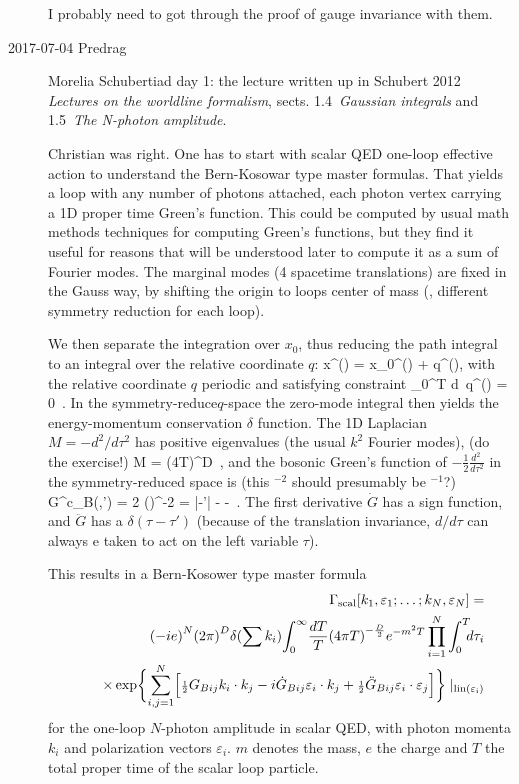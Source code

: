\begin{description}
I probably need to got through the proof of gauge invariance with them.

\item[2017-07-04 Predrag] Morelia Schubertiad day 1:
the lecture written up in Schubert 2012 {\em Lectures on
the worldline formalism}, sects. 1.4~{\em Gaussian integrals} and
1.5~{\em The N-photon amplitude}.

Christian was right. One has to start with scalar QED one-loop effective
action to understand the Bern-Kosowar type master formulas. That yields a
loop with any number of photons attached, each photon vertex carrying a
1D proper time Green's function. This could be computed by usual math
methods techniques for computing Green's functions, but they find it
useful for reasons that will be understood later to compute it as a sum
of Fourier modes. The marginal modes (4 spacetime translations) are fixed
in the Gauss way, by shifting the origin to loops center of mass (\ie,
different symmetry reduction for each loop).

We then separate the integration over $x_0$, thus reducing the path integral
to an integral over the relative coordinate $q$:
\beq
x^{\mu}(\tau) = x_0^{\mu}(\tau) + q^{\mu}(\tau),
with  the relative coordinate $q$ periodic and satisfying constraint
\beq
\int_0^T d\tau\, q^{\mu}(\tau) = 0
\,.
In the symmetry-reduce$q$-space the zero-mode integral then yields
the energy-momentum conservation $\delta$ function. The 1D Laplacian
$M=-d^2/d\tau^2$ has positive eigenvalues (the usual $k^2$ Fourier modes),
(do the exercise!)
\beq
\det M = (4T)^D
\,,
and the bosonic Green's function of $-\frac{1}{2}\frac{d^2~}{d\tau^2}$ in
the symmetry-reduced space is
(this ${}^{-2}$ should presumably be ${}^{-1}$?)
\beq
G^c_B(\tau,\tau')
= 2 \bra{\tau}\left(\right)^{-2}
= |\tau-\tau'| -  - 
\,.
The first derivative $\dot{G}$  has a sign function, and $\ddot{G}$ has a
$\delta(\tau-\tau')$ (because of the translation invariance, $d/d\tau$
can always e taken to act on the left variable $\tau$).

This results in a Bern-Kosower type master formula
\begin{eqnarray}
&&\!\!\!\!\!\!\!
\Gamma_{\rm scal}[k_1,\varepsilon_1;\ldots;k_N,\varepsilon_N]
=
\label{Schubert12(1.43)}\\
&&\quad{(-ie)}^N
{(2\pi )}^D\delta (\sum k_i)
{\displaystyle\int_{0}^{\infty}}{dT\over T}
{(4\pi T)}^{-{D\over 2}} e^{-m^2T}
\prod_{i=1}^N \int_0^T\!\!\!d\tau_i
\continue
&&
\quad %
\times
\exp\biggl\lbrace\sum_{i,j=1}^N
\Bigl\lbrack  \half G_{Bij} k_i\cdot k_j
-i\dot G_{Bij}\varepsilon_i\cdot k_j
+\half\ddot G_{Bij}\varepsilon_i\cdot\varepsilon_j
\Bigr\rbrack\biggr\rbrace
\mid_{\rm {\rm lin}(\varepsilon_i)}
\nonumber
\end{eqnarray}
for the one-loop
$N$-photon amplitude in scalar QED, with photon
momenta $k_i$ and polarization vectors
$\varepsilon_i$. $m$ denotes the mass, $e$ the charge and $T$ the total proper time
of the scalar loop particle.



\end{description}
